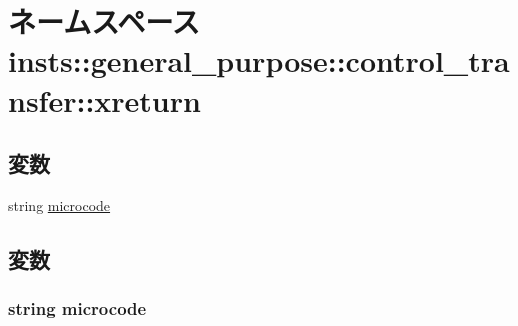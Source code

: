 \hypertarget{namespaceinsts_1_1general__purpose_1_1control__transfer_1_1xreturn}{
\section{ネームスペース insts::general\_\-purpose::control\_\-transfer::xreturn}
\label{namespaceinsts_1_1general__purpose_1_1control__transfer_1_1xreturn}
}
\subsection*{変数}
\begin{DoxyCompactItemize}
\item 
string \hyperlink{namespaceinsts_1_1general__purpose_1_1control__transfer_1_1xreturn_a770f11a173e99389a8802f0107ed8f52}{microcode}
\end{DoxyCompactItemize}


\subsection{変数}
\hypertarget{namespaceinsts_1_1general__purpose_1_1control__transfer_1_1xreturn_a770f11a173e99389a8802f0107ed8f52}{
\subsubsection[{microcode}]{\setlength{\rightskip}{0pt plus 5cm}string {\bf microcode}}}
\label{namespaceinsts_1_1general__purpose_1_1control__transfer_1_1xreturn_a770f11a173e99389a8802f0107ed8f52}
